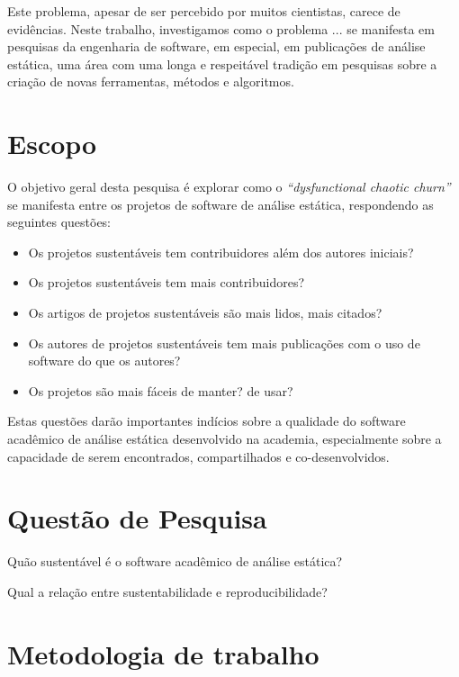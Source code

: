 
Este problema, apesar de ser percebido por muitos cientistas, carece de
evidências. %
Neste trabalho, investigamos como o problema ...  se manifesta em pesquisas da
engenharia de software, em especial, em publicações de análise estática, uma
área com uma longa e respeitável tradição em pesquisas sobre a criação de novas
ferramentas, métodos e algoritmos.

\section{Escopo}

O objetivo geral desta pesquisa é explorar como o {\it ``dysfunctional chaotic
churn''} se manifesta entre os projetos de software de análise estática,
respondendo as seguintes questões:

\begin{itemize}
  \item Os projetos sustentáveis tem contribuidores além dos autores iniciais?
  \item Os projetos sustentáveis tem mais contribuidores?
  \item Os artigos de projetos sustentáveis são mais lidos, mais citados?
  \item Os autores de projetos sustentáveis tem mais publicações com o uso de software do que os autores?
  \item Os projetos são mais fáceis de manter? de usar? 
\end{itemize}

Estas questões darão importantes indícios sobre a qualidade do software acadêmico de
análise estática desenvolvido na academia, especialmente sobre a capacidade de serem 
encontrados, compartilhados e co-desenvolvidos.

\section{Questão de Pesquisa}

Quão sustentável é o software acadêmico de análise estática?

Qual a relação entre sustentabilidade e reproducibilidade?

\section{Metodologia de trabalho}

